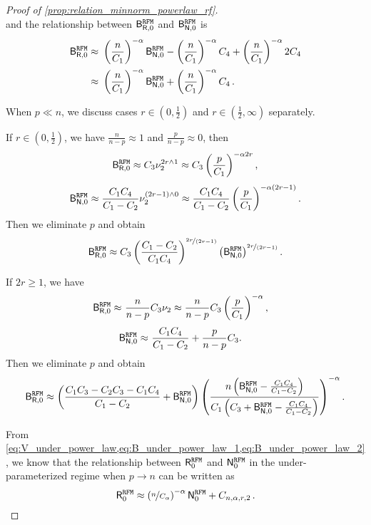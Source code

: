 \begin{proof}[Proof of \cref{prop:relation_minnorm_powerlaw_rf}]
\[\]
and the relationship between $\mathsf B_{\mathsf R,0}^{\tt RFM}$ and $\mathsf B_{\mathsf N,0}^{\tt RFM}$ is 
\begin{equation}\label{eq:B_under_power_law_2}
    \begin{split}
        \mathsf B_{\mathsf R,0}^{\tt RFM} \approx&~ \left(\frac{n}{C_1}\right)^{-\alpha} \mathsf B_{\mathsf N,0}^{\tt RFM} - \left(\frac{n}{C_1}\right)^{-\alpha}C_4 + \left(\frac{n}{C_1}\right)^{-\alpha}2C_4\\
        \approx&~ \left(\frac{n}{C_1}\right)^{-\alpha} \mathsf B_{\mathsf N,0}^{\tt RFM} + \left(\frac{n}{C_1}\right)^{-\alpha}C_4\,.
    \end{split}
\end{equation}


When $p \ll n$, we discuss cases $r \in (0, \frac{1}{2})$ and $r \in (\frac{1}{2}, \infty)$ separately. 

If $r \in (0, \frac{1}{2})$, we have $\frac{n}{n-p} \approx 1$ and $\frac{p}{n-p} \approx 0$, then
\[
\begin{aligned}
\mathsf B_{\mathsf R,0}^{\tt RFM} 
\approx C_3 \nu_2^{2r\wedge1} \approx C_3 \left( \frac{p}{C_1} \right)^{-\alpha2r},
\end{aligned}
\]
\[
\begin{aligned}
\mathsf B_{\mathsf N,0}^{\tt RFM} \approx \frac{C_1C_4}{C_1-C_2} \nu_2^{(2r-1)\wedge0} \approx \frac{C_1C_4}{C_1-C_2} \left(\frac{p}{C_1}\right)^{-\alpha\left(2r-1\right)}.
\end{aligned}
\]
Then we eliminate $p$ and obtain
\[
\begin{aligned}
\mathsf B_{\mathsf R,0}^{\tt RFM} \approx C_3 \left(\frac{C_1-C_2}{C_1C_4}\right)^{\nicefrac{2r}{(2r-1)}} \left(\mathsf B_{\mathsf N,0}^{\tt RFM}\right)^{\nicefrac{2r}{(2r-1)}}.
\end{aligned}
\]

If $2r \ge 1$, we have
\[
\begin{aligned}
\mathsf B_{\mathsf R,0}^{\tt RFM} \approx&~ \frac{n}{n-p} C_3 \nu_2 \approx \frac{n}{n-p} C_3\left(\frac{p}{C_1}\right)^{-\alpha},
\end{aligned}
\]
\[
\begin{aligned}
\mathsf B_{\mathsf N,0}^{\tt RFM} \approx&~ \frac{C_1C_4}{C_1-C_2} + \frac{p}{n-p}C_3 .
\end{aligned}
\]
Then we eliminate $p$ and obtain
\[
\begin{aligned}
\mathsf B_{\mathsf R,0}^{\tt RFM} \approx \left(\frac{C_1C_3-C_2C_3-C_1C_4}{C_1-C_2}+\mathsf B_{\mathsf N,0}^{\tt RFM}\right)\left(\frac{n\left(\mathsf B_{\mathsf N,0}^{\tt RFM}-\frac{C_1C_4}{C_1-C_2}\right)}{C_1\left(C_3+\mathsf B_{\mathsf N,0}^{\tt RFM}-\frac{C_1C_4}{C_1-C_2}\right)}\right)^{-\alpha}.
\end{aligned}
\]

From \cref{eq:V_under_power_law,eq:B_under_power_law_1,eq:B_under_power_law_2}, we know that the relationship between \(\mathsf R_0^{\tt RFM}\) and \(\mathsf N_0^{\tt RFM}\) in the under-parameterized regime when \(p \to n\) can be written as
\[
\mathsf R_0^{\tt RFM} \approx \left(\nicefrac{n}{C_\alpha}\right)^{-\alpha} \mathsf N_0^{\tt RFM} + C_{n,\alpha,r,2}\,.
\]

\end{proof}



    
